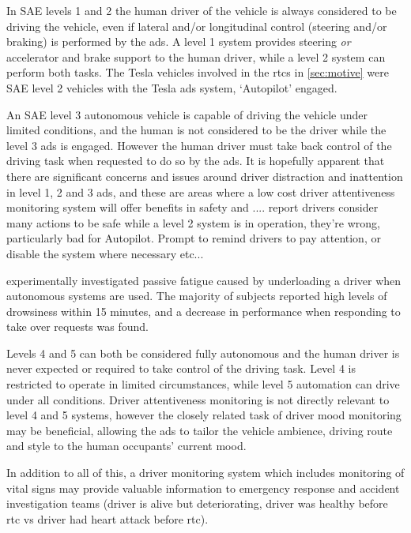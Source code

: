 \documentclass[11pt, parskip=half*,twoside=false]{scrbook}
\begin{document}
In SAE levels 1 and 2 the human driver of the vehicle is always considered to be driving the vehicle, even if lateral and/or longitudinal control (steering and/or braking) is performed by the \gls{ads}. A level 1 system provides steering \emph{or} accelerator and brake support to the human driver, while a level 2 system can perform both tasks. The Tesla vehicles involved in the \glspl{rtc} in \cref{sec:motive} were SAE level 2 vehicles with the Tesla \gls{ads} system, `Autopilot' engaged. 

An SAE level 3 autonomous vehicle is capable of driving the vehicle under limited conditions, and the human is not considered to be the driver while the level 3 \gls{ads} is engaged. However the human driver must take back control of the driving task when requested to do so by the \gls{ads}. It is hopefully apparent that there are significant concerns and issues around driver distraction and inattention in level 1, 2 and 3 \gls{ads}, and these are areas where a low cost driver attentiveness monitoring system will offer benefits in safety and ....  \citet{teohWhatNameDrivers2020} report drivers consider many actions to be safe while a level 2 system is in operation, they're wrong, particularly bad for Autopilot. Prompt to remind drivers to pay attention, or disable the system where necessary etc...

\citet{goncalvesDrowsinessConditionalAutomation2016} experimentally investigated passive fatigue caused by underloading a driver when autonomous systems are used. The majority of subjects reported high levels of drowsiness within 15 minutes, and a decrease in performance when responding to take over requests was found.

Levels 4 and 5 can both be considered fully autonomous and the human driver is never expected or required to take control of the driving task. Level 4 is restricted to operate in limited circumstances, while level 5 automation can drive under all conditions. Driver attentiveness monitoring is not directly relevant to level 4 and 5 systems, however the closely related task of driver mood monitoring may be beneficial, allowing the \gls{ads} to tailor the vehicle ambience, driving route and style to the human occupants' current mood.

In addition to all of this, a driver monitoring system which includes monitoring of vital signs may provide valuable information to emergency response and accident investigation teams (driver is alive but deteriorating, driver was healthy before \gls{rtc} vs driver had heart attack before \gls{rtc}). 
\end{document}
